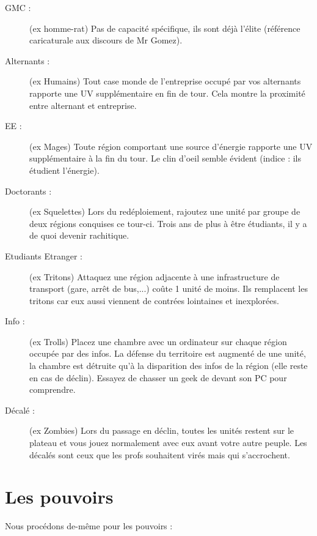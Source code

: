 \documentclass[11pt]{report}
\begin{document}
\begin{description}
		\item[GMC :] (ex homme-rat) Pas de capacité spécifique, ils sont déjà l'élite (référence caricaturale aux discours de Mr Gomez).
		\item[Alternants :] (ex Humains) Tout case monde de l'entreprise occupé par vos alternants rapporte une UV supplémentaire en fin de tour. Cela montre la proximité entre alternant et entreprise.
		\item[EE : ] (ex Mages) Toute région comportant une source d'énergie rapporte une UV supplémentaire à la fin du tour. Le clin d'oeil semble évident (indice : ils étudient l'énergie).
		\item[Doctorants :] (ex Squelettes) Lors du redéploiement, rajoutez une unité par groupe de deux régions conquises ce tour-ci. Trois ans de plus à être étudiants, il y a de quoi devenir rachitique.
		\item[Etudiants Etranger :] (ex Tritons) Attaquez une région adjacente à une infrastructure de transport (gare, arrêt de bus,...) coûte 1 unité de moins. Ils remplacent les tritons car eux aussi viennent de contrées lointaines et inexplorées.
		\item[Info :] (ex Trolls) Placez une chambre avec un ordinateur sur chaque région occupée par des infos. La défense du territoire est augmenté de une unité, la chambre est détruite qu'à la disparition des infos de la région (elle reste en cas de déclin). Essayez de chasser un geek de devant son PC pour comprendre.
		\item[Décalé :] (ex Zombies) Lors du passage en déclin, toutes les unités restent sur le plateau et vous jouez normalement avec eux avant votre autre peuple. Les décalés sont ceux que les profs souhaitent virés mais qui s'accrochent.
	\end{description}

	\section{Les pouvoirs}
	Nous procédons de-même pour les pouvoirs :
	
\end{document}
